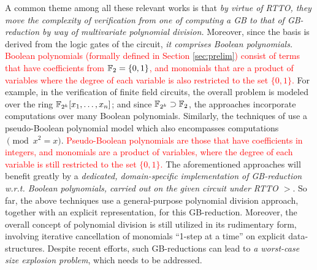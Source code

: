 A common theme among all these relevant works is that {\it by virtue
of RTTO, they move the complexity of verification from one of
computing a GB to that of GB-reduction by way of multivariate
polynomial division.} Moreover, since the \Grobner basis is derived
from the logic gates of the circuit, {\it it comprises Boolean
polynomials.} \textcolor{red}{Boolean polynomials (formally defined in
  Section \ref{sec:prelim})  consist of terms that have coefficients
  from ${\mathbb{F}}_{2} = \{0,1\}$, and monomials that are a product of
  variables where the degree of each variable is also restricted to
  the set $\{0,1\}$.} For example, in the verification of finite field 
circuits, the overall problem is modeled over the ring
${\mathbb{F}}_{2^k}[x_1,\dots,x_n]$; and %
since ${\mathbb{F}}_{2^k} \supset {\mathbb{F}}_{2}$, the approaches incorporate computations
over many Boolean polynomials. Similarly, the techniques of
\cite{wedler:date11} use a pseudo-Boolean polynomial model which also
encompasses computations $\pmod{x^2=x}$. \textcolor{red}{Pseudo-Boolean
  polynomials %
are those that have coefficients in integers, and monomials are a
product of variables, where the degree of each variable is still
restricted to the set $\{0,1\}$.}  The aforementioned approaches will
benefit greatly by a {\it dedicated,  
domain-specific implementation of GB-reduction w.r.t. Boolean polynomials,
carried out on the given circuit under RTTO $>$}. So far, the above
techniques  
\cite{wienand:cav08,pruss:tcad,lv:tcad2013,rolf:date16,ciesielski:dac2015,cunxi:aspdac17}
use a general-purpose polynomial division approach, together with an
explicit representation, for this GB-reduction. 
Moreover, the overall concept of polynomial division is
still utilized in its rudimentary form, involving iterative
cancellation of monomials ``1-step at a time'' on explicit
data-structures. Despite recent efforts, such GB-reductions can lead
to {\it a worst-case size explosion problem}, which needs to be
addressed. 


